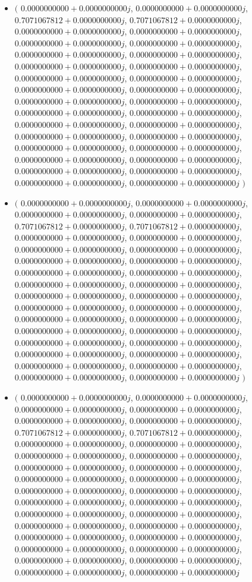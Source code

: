 \documentclass[14pt,a4paper]{article}
\begin{document}
\begin{itemize}
\item
$\big($
$0.0000000000+0.0000000000j$, $0.0000000000+0.0000000000j$, $0.7071067812+0.0000000000j$, $0.7071067812+0.0000000000j$, $0.0000000000+0.0000000000j$, $0.0000000000+0.0000000000j$, $0.0000000000+0.0000000000j$, $0.0000000000+0.0000000000j$, $0.0000000000+0.0000000000j$, $0.0000000000+0.0000000000j$, $0.0000000000+0.0000000000j$, $0.0000000000+0.0000000000j$, $0.0000000000+0.0000000000j$, $0.0000000000+0.0000000000j$, $0.0000000000+0.0000000000j$, $0.0000000000+0.0000000000j$, $0.0000000000+0.0000000000j$, $0.0000000000+0.0000000000j$, $0.0000000000+0.0000000000j$, $0.0000000000+0.0000000000j$, $0.0000000000+0.0000000000j$, $0.0000000000+0.0000000000j$, $0.0000000000+0.0000000000j$, $0.0000000000+0.0000000000j$, $0.0000000000+0.0000000000j$, $0.0000000000+0.0000000000j$, $0.0000000000+0.0000000000j$, $0.0000000000+0.0000000000j$, $0.0000000000+0.0000000000j$, $0.0000000000+0.0000000000j$, $0.0000000000+0.0000000000j$, $0.0000000000+0.0000000000j$
$\big)$
\item
$\big($
$0.0000000000+0.0000000000j$, $0.0000000000+0.0000000000j$, $0.0000000000+0.0000000000j$, $0.0000000000+0.0000000000j$, $0.7071067812+0.0000000000j$, $0.7071067812+0.0000000000j$, $0.0000000000+0.0000000000j$, $0.0000000000+0.0000000000j$, $0.0000000000+0.0000000000j$, $0.0000000000+0.0000000000j$, $0.0000000000+0.0000000000j$, $0.0000000000+0.0000000000j$, $0.0000000000+0.0000000000j$, $0.0000000000+0.0000000000j$, $0.0000000000+0.0000000000j$, $0.0000000000+0.0000000000j$, $0.0000000000+0.0000000000j$, $0.0000000000+0.0000000000j$, $0.0000000000+0.0000000000j$, $0.0000000000+0.0000000000j$, $0.0000000000+0.0000000000j$, $0.0000000000+0.0000000000j$, $0.0000000000+0.0000000000j$, $0.0000000000+0.0000000000j$, $0.0000000000+0.0000000000j$, $0.0000000000+0.0000000000j$, $0.0000000000+0.0000000000j$, $0.0000000000+0.0000000000j$, $0.0000000000+0.0000000000j$, $0.0000000000+0.0000000000j$, $0.0000000000+0.0000000000j$, $0.0000000000+0.0000000000j$
$\big)$
\item
$\big($
$0.0000000000+0.0000000000j$, $0.0000000000+0.0000000000j$, $0.0000000000+0.0000000000j$, $0.0000000000+0.0000000000j$, $0.0000000000+0.0000000000j$, $0.0000000000+0.0000000000j$, $0.7071067812+0.0000000000j$, $0.7071067812+0.0000000000j$, $0.0000000000+0.0000000000j$, $0.0000000000+0.0000000000j$, $0.0000000000+0.0000000000j$, $0.0000000000+0.0000000000j$, $0.0000000000+0.0000000000j$, $0.0000000000+0.0000000000j$, $0.0000000000+0.0000000000j$, $0.0000000000+0.0000000000j$, $0.0000000000+0.0000000000j$, $0.0000000000+0.0000000000j$, $0.0000000000+0.0000000000j$, $0.0000000000+0.0000000000j$, $0.0000000000+0.0000000000j$, $0.0000000000+0.0000000000j$, $0.0000000000+0.0000000000j$, $0.0000000000+0.0000000000j$, $0.0000000000+0.0000000000j$, $0.0000000000+0.0000000000j$, $0.0000000000+0.0000000000j$, $0.0000000000+0.0000000000j$, $0.0000000000+0.0000000000j$, $0.0000000000+0.0000000000j$, $0.0000000000+0.0000000000j$, $0.0000000000+0.0000000000j$

\end{itemize}
\end{document}
